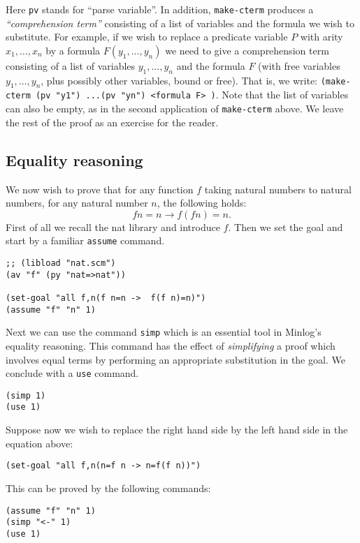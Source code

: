 \documentclass[12pt]{amsart}
\newcommand{\inquotes}[1]{``#1''}
\newcommand{\mi}{Minlog}
\begin{document}
Here \texttt{pv} stands for \inquotes{parse variable}.  In addition,
\texttt{make-cterm} produces a \emph{\inquotes{comprehension term}}
consisting of a list of variables and the formula we wish to
substitute.  For example, if we wish to replace a predicate variable
$P$ with arity $x_1, \dots, x_n$ by a formula $F (y_1, \dots, y_n)$ we
need to give a comprehension term consisting of a list of variables
$y_1, \dots, y_n$ and the formula $F$ (with free variables $y_1,
\dots, y_n$, plus possibly other variables, bound or free). That is,
we write: \texttt{(make-cterm (pv "y1") ...(pv "yn") <formula F> )}.
Note that the list of variables can also be empty, as in the second
application of \texttt{make-cterm} above.  We leave the rest of the
proof as an exercise for the reader.


\subsection{Equality reasoning}
We now wish to prove that for any function $f$ taking natural numbers
to natural numbers, for any natural number $n$, the following holds:
\begin{equation*}
  f n = n \to  f (f n) = n.
\end{equation*}
First of all we recall the nat library and introduce $f$.  Then we set
the goal and start by a familiar \texttt{assume} command.
\begin{verbatim}
;; (libload "nat.scm")
(av "f" (py "nat=>nat"))

(set-goal "all f,n(f n=n ->  f(f n)=n)")
(assume "f" "n" 1)
\end{verbatim}

Next we can use the command \texttt{simp} which is an essential tool
in \mi 's equality reasoning. This command has the effect of
\emph{simplifying} a proof which involves equal terms by performing an
appropriate substitution in the goal.  We conclude with a \texttt{use}
command.
\begin{verbatim}
(simp 1)
(use 1)
\end{verbatim}

Suppose now we wish to replace the right hand side by the left hand
side in the equation above:
\begin{verbatim}
(set-goal "all f,n(n=f n -> n=f(f n))")
\end{verbatim}

This can be proved by the following commands:
\begin{verbatim}
(assume "f" "n" 1)
(simp "<-" 1)
(use 1)
\end{verbatim}
\end{document}
